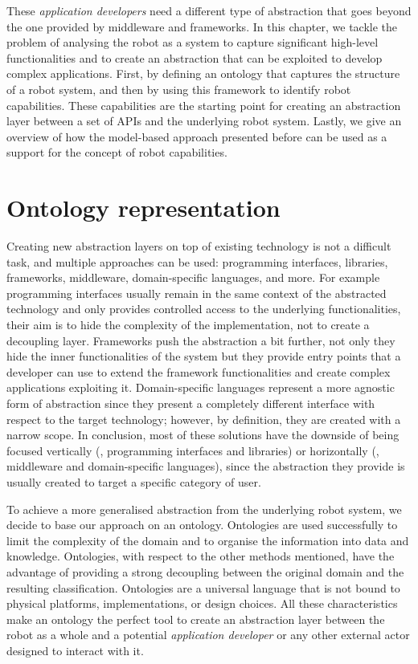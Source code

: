 These \textit{application developers} need a different type of abstraction that goes beyond the one provided by middleware and frameworks. In this chapter, we tackle the problem of analysing the robot as a system to capture significant high-level functionalities and to create an abstraction that can be exploited to develop complex applications. First, by defining an ontology that captures the structure of a robot system, and then by using this framework to identify robot capabilities. These capabilities are the starting point for creating an abstraction layer between a set of APIs and the underlying robot system. Lastly, we give an overview of how the model-based approach presented before can be used as a support for the concept of robot capabilities.

\minitoc
\newpage

\section{Ontology representation}
\label{sec:onto}
Creating new abstraction layers on top of existing technology is not a difficult task, and multiple approaches can be used: programming interfaces, libraries, frameworks, middleware, domain-specific languages, and more. For example programming interfaces usually remain in the same context of the abstracted technology and only provides controlled access to the underlying functionalities, their aim is to hide the complexity of the implementation, not to create a decoupling layer. Frameworks push the abstraction a bit further, not only they hide the inner functionalities of the system but they provide entry points that a developer can use to extend the framework functionalities and create complex applications exploiting it. Domain-specific languages represent a more agnostic form of abstraction since they present a completely different interface with respect to the target technology; however, by definition, they are created with a narrow scope. In conclusion, most of these solutions have the downside of being focused vertically (\eg, programming interfaces and libraries) or horizontally (\eg, middleware and domain-specific languages), since the abstraction they provide is usually created to target a specific category of user.

To achieve a more generalised abstraction from the underlying robot system, we decide to base our approach on an ontology. Ontologies are used successfully to limit the complexity of the domain and to organise the information into data and knowledge. Ontologies, with respect to the other methods mentioned, have the advantage of providing a strong decoupling between the original domain and the resulting classification. Ontologies are a universal language that is not bound to physical platforms, implementations, or design choices. All these characteristics make an ontology the perfect tool to create an abstraction layer between the robot as a whole and a potential \textit{application developer} or any other external actor designed to interact with it. 

